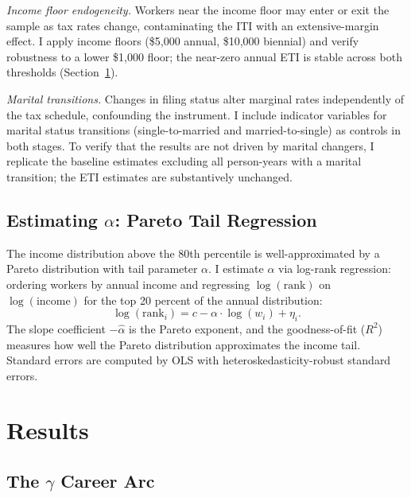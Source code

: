 \documentclass[12pt]{article}
\theoremstyle{definition}
\theoremstyle{remark}
\begin{document}
\emph{Income floor endogeneity.} Workers near the income floor may enter or exit the sample
as tax rates change, contaminating the ITI with an extensive-margin effect. I apply income
floors (\$5,000 annual, \$10,000 biennial) and verify robustness to a lower \$1,000 floor;
the near-zero annual ETI is stable across both thresholds (Section~\ref{sec:results}).

\emph{Marital transitions.} Changes in filing status alter marginal rates independently of
the tax schedule, confounding the instrument. I include indicator variables for marital
status transitions (single-to-married and married-to-single) as controls in both stages.
To verify that the results are not driven by marital changers, I replicate the baseline
estimates excluding all person-years with a marital transition; the ETI estimates are
substantively unchanged.

\subsection{Estimating $\alpha$: Pareto Tail Regression}

The income distribution above the 80th percentile is well-approximated by a Pareto distribution
with tail parameter $\alpha$. I estimate $\alpha$ via log-rank regression: ordering workers by
annual income and regressing $\log(\text{rank})$ on $\log(\text{income})$ for the top 20
percent of the annual distribution:
\begin{equation}
\label{eq:pareto}
\log(\text{rank}_i) = c - \alpha \cdot \log(w_i) + \eta_i.
\end{equation}
The slope coefficient $-\hat{\alpha}$ is the Pareto exponent, and the goodness-of-fit ($R^2$)
measures how well the Pareto distribution approximates the income tail. Standard errors are
computed by OLS with heteroskedasticity-robust standard errors.

\section{Results}
\label{sec:results}

\subsection{The $\gamma$ Career Arc}
\end{document}

